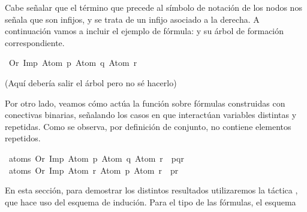 \begin{isabellebody}
\begin{isamarkuptext}
Cabe señalar que el término  que precede al símbolo de notación de los nodos nos señala que 
son infijos, y  se trata de un infijo asociado a la derecha.
A continuación vamos a incluir el ejemplo de fórmula:  y su árbol de formación 
correspondiente.%
\end{isamarkuptext}\isamarkuptrue%
\isamarkupfalse%
\ {\isachardoublequoteopen}Or\ {\isacharparenleft}Imp\ {\isacharparenleft}Atom\ p{\isacharparenright}\ {\isacharparenleft}Atom\ q{\isacharparenright}{\isacharparenright}\ {\isacharparenleft}Atom\ r{\isacharparenright}{\isachardoublequoteclose}%
\begin{isamarkuptext}%
(Aquí debería salir el árbol pero no sé hacerlo)%
\end{isamarkuptext}\isamarkuptrue%
%
\begin{isamarkuptext}%
Por otro lado, veamos cómo actúa la función  sobre fórmulas construidas con 
conectivas binarias, señalando los casos en que interactúan variables distintas y repetidas. 
Como se observa, por definición de conjunto, no contiene elementos repetidos.%
\end{isamarkuptext}\isamarkuptrue%
\isamarkupfalse%
\ {\isachardoublequoteopen}atoms\ {\isacharparenleft}Or\ {\isacharparenleft}Imp\ {\isacharparenleft}Atom\ p{\isacharparenright}\ {\isacharparenleft}Atom\ q{\isacharparenright}{\isacharparenright}\ {\isacharparenleft}Atom\ r{\isacharparenright}{\isacharparenright}\ {\isacharequal}\ {\isacharbraceleft}p{\isacharcomma}q{\isacharcomma}r{\isacharbraceright}{\isachardoublequoteclose}\isanewline
\ %
\isadelimproof
%
\endisadelimproof
%
\isatagproof
%
\endisatagproof
{\isafoldproof}%
%
\isadelimproof
%
\endisadelimproof
\isanewline
{}\isamarkupfalse%
\ {\isachardoublequoteopen}atoms\ {\isacharparenleft}Or\ {\isacharparenleft}Imp\ {\isacharparenleft}Atom\ r{\isacharparenright}\ {\isacharparenleft}Atom\ p{\isacharparenright}{\isacharparenright}\ {\isacharparenleft}Atom\ r{\isacharparenright}{\isacharparenright}\ {\isacharequal}\ {\isacharbraceleft}p{\isacharcomma}r{\isacharbraceright}{\isachardoublequoteclose}\isanewline
\ %
\isadelimproof
%
\endisadelimproof
%
\isatagproof
%
\endisatagproof
{\isafoldproof}%
%
\isadelimproof
%
\endisadelimproof
%
\begin{isamarkuptext}%
En esta sección, para demostrar los distintos resultados utilizaremos la táctica 
, que hace uso del esquema de indución. Para el tipo de las fórmulas, el esquema 

\end{isamarkuptext}
\end{isabellebody}
